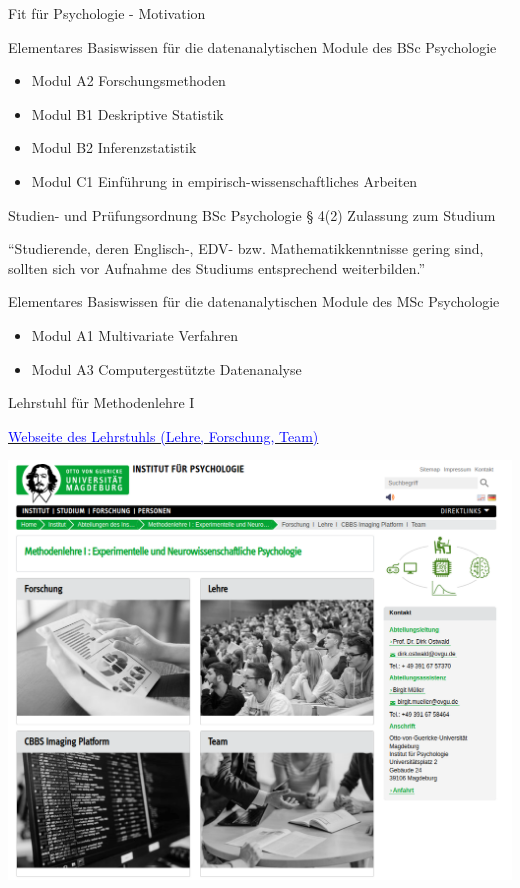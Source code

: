 \documentclass[
  8pt,
  ignorenonframetext,
  t]{beamer}
\providecommand{\tightlist}{%
  \setlength{\itemsep}{0pt}\setlength{\parskip}{0pt}}
\begin{document}
\begin{frame}{Fit für Psychologie - Motivation}
\protect\hypertarget{fit-fuxfcr-psychologie---motivation}{}

Elementares Basiswissen für die datenanalytischen Module des BSc
Psychologie

\small

\begin{itemize}
\tightlist
\item
  Modul A2 Forschungsmethoden
\item
  Modul B1 Deskriptive Statistik
\item
  Modul B2 Inferenzstatistik
\item
  Modul C1 Einführung in empirisch-wissenschaftliches Arbeiten
\end{itemize}

\normalsize

Studien- und Prüfungsordnung BSc Psychologie § 4(2) Zulassung zum
Studium

\small

``Studierende, deren Englisch-, EDV- bzw. Mathematikkenntnisse gering
sind, sollten sich vor Aufnahme des Studiums entsprechend
weiterbilden.''

\normalsize

Elementares Basiswissen für die datenanalytischen Module des MSc
Psychologie

\small

\begin{itemize}
\tightlist
\item
  Modul A1 Multivariate Verfahren
\item
  Modul A3 Computergestützte Datenanalyse
\end{itemize}
\end{frame}

\begin{frame}{Lehrstuhl für Methodenlehre I}
\protect\hypertarget{lehrstuhl-fuxfcr-methodenlehre-i}{}

\href{https://www.ipsy.ovgu.de/methodenlehre_I-path-980,1404.html}{\textcolor{blue}{Webseite des Lehrstuhls (Lehre, Forschung, Team)}}

\vspace{3mm}

\begin{center}\includegraphics[width=0.7\linewidth]{../Abbildungen/Lehrstuhlseite} \end{center}
\end{frame}
\end{document}
